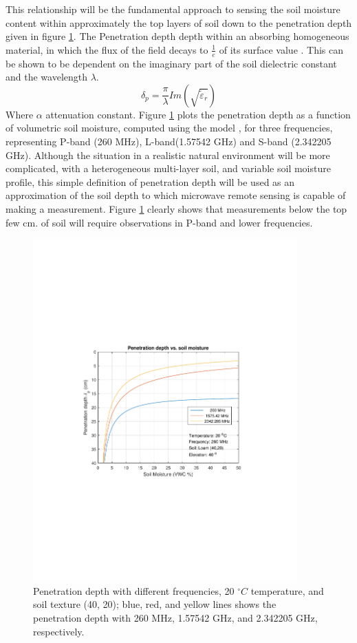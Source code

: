 \documentclass[draftcls,onecolumn]{IEEEtran}  %
\begin{document}
This relationship will be the fundamental approach to sensing the soil moisture content within approximately the top layers of soil down to the penetration depth given in figure \ref{fig:depth}. The Penetration depth depth within an absorbing homogeneous material, in which the flux  of the field decays to $\frac{1}{e}$ of its surface value \cite{Ulaby:1981}.  This can be shown to be dependent on the imaginary part of the soil dielectric constant and the wavelength $\lambda$.
\begin{equation}
  \delta_p  = \frac{\pi}{\lambda} Im(\sqrt{\tilde{\varepsilon}_{r}})
\end{equation}
Where  $\alpha$ attenuation constant. Figure \ref{fig:depth} plots the penetration depth as a function of volumetric soil moisture, computed using the model \cite{Peplinski:1995}, for three frequencies, representing P-band (260 MHz), L-band(1.57542 GHz) and S-band (2.342205 GHz). Although the situation in a realistic  natural environment will be more complicated, with a heterogeneous multi-layer soil, and variable soil moisture profile, this simple definition of penetration depth will be used as an approximation of the soil depth to which microwave remote sensing is capable of making a measurement.  Figure \ref{fig:depth} clearly shows that measurements below the top few cm. of soil will require observations in P-band and lower frequencies. 
\begin{figure}[!t]
	\centering
	\includegraphics[width=4in]{pdf/penetration_depth.pdf}
	\caption{Penetration depth with different frequencies, 20 $^\circ C$ temperature, and soil texture (40, 20); blue, red, and yellow lines shows the penetration depth with 260 MHz, 1.57542 GHz, and 2.342205 GHz, respectively.}
   \centering
	\label{fig:depth}
\end{figure}
\end{document}
